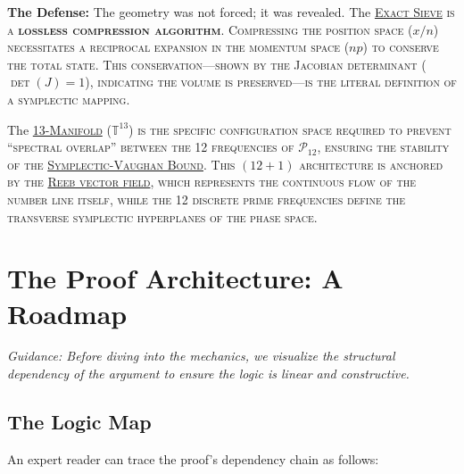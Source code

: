\documentclass[sn-mathphys-num, pdflatex]{sn-jnl}
\newcommand{\gterm}[2]{\begingroup\normalfont\scshape\hyperlink{#1}{#2}\endgroup}
\begin{document}
\textbf{The Defense:} The geometry was not forced; it was revealed. The \gterm{exact_sieve}{Exact Sieve} is a \textbf{lossless compression algorithm}. Compressing the position space ($x/n$) necessitates a reciprocal expansion in the momentum space ($np$) to conserve the total state. This conservation---shown by the Jacobian determinant ($\det(J)=1$), indicating the volume is preserved---is the literal definition of a symplectic mapping. 

The \gterm{m13}{13-Manifold} ($\mathbb{T}^{13}$) is the specific configuration space required to prevent ``spectral overlap'' between the 12 frequencies of $\mathcal{P}_{12}$, ensuring the stability of the \gterm{csv}{Symplectic-Vaughan Bound}. This $(12+1)$ architecture is anchored by the \gterm{reeb}{Reeb vector field}, which represents the continuous flow of the number line itself, while the 12 discrete prime frequencies define the transverse symplectic hyperplanes of the phase space.

\section{The Proof Architecture: A Roadmap}

\textit{Guidance: Before diving into the mechanics, we visualize the structural dependency of the argument to ensure the logic is linear and constructive.} 

\subsection{The Logic Map}
An expert reader can trace the proof's dependency chain as follows:
\end{document}
